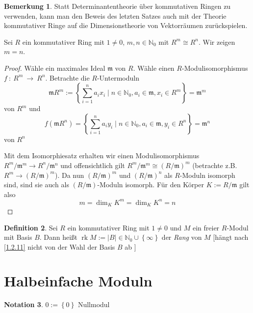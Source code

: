 \documentclass[
twoside=semi,
fontsize=12,
DIV=12, 
cleardoublepage=current,
leqno,
headings=optiontoheadandtoc, 
toc=idx
]{scrbook}
\newcommand{\N}{\mathbb{N}}
\newcommand{\set}[1]{\left\{ #1 \right\}}
\DeclareMathOperator{\rk}{rk}
\theoremstyle{definition}
\newtheorem{definition}{Definition}[section]
\newtheorem{bemerkung}[definition]{Bemerkung}
\newtheorem{notation}[definition]{Notation}
\begin{document}
	\begin{bemerkung}\label{1.2.12}\hfill\newline
		Statt Determinantentheorie \"uber kommutativen Ringen zu verwenden, kann man den Beweis des letzten Satzes auch mit der Theorie kommutativer Ringe auf die Dimensionstheorie von Vektorr\"aumen zur\"uckspielen. 
		
		\noindent Sei $R$ ein kommutativer Ring mit $1 \neq 0$, $m, n\in \N_0$ mit $R^m \cong R^n$. Wir zeigen $m = n$.
		
		\begin{proof}
			W\"ahle ein maximales Ideal $\mathfrak{m}$ von $R$. W\"ahle einen $R$-Modulisomorphismus $f~:~R^m~\to~R^n$. Betrachte die $R$-Untermoduln
			\[\mathfrak{m}R^m := \set{\sum_{i=1}^n a_ix_i \mid n \in \N_0, a_i \in \mathfrak{m}, x_i \in R^m} = \mathfrak{m}^m\]
			von $R^m$ und 
			\[f(\mathfrak{m}R^n) = \set{\sum_{i=1}^n a_iy_i \mid n \in \N_0, a_i \in \mathfrak{m}, y_i \in R^n} = \mathfrak{m}^n\]
			von $R^n$
			
			\noindent Mit dem Isomorphiesatz erhalten wir einen Modulisomorphismus $R^m/\mathfrak{m}^m \to R^n/\mathfrak{m}^n$ und offensichtlich gilt $R^m/\mathfrak{m}^m  \cong (R/\mathfrak{m})^m$ (betrachte z.B. $R^m \to (R/\mathfrak{m})^m$).\newline
			Da nun $(R/\mathfrak{m})^m$ und $(R/\mathfrak{m})^n$ als $R$-Moduln isomorph sind, sind sie auch als $(R/\mathfrak{m})$-Moduln isomorph. F\"ur den K\"orper $K:= R/\mathfrak{m}$ gilt also 
			\[m = \dim_K K^m = \dim_K K^n = n\]
		\end{proof}
	\end{bemerkung}

	\begin{definition}\label{1.2.13}\hfill\newline
		Sei $R$ ein kommutativer Ring mit $1 \neq 0$ und $M$ ein freier $R$-Modul mit Basis $B$. Dann hei\ss t $\rk M := |B| \in \N_0 \cup \set{\infty}$ der \emph{Rang} von $M$ [h\"angt nach \ref{1.2.11} nicht von der Wahl der Basis $B$ ab ]
	\end{definition}
	
	
	\newpage
	
	\section{Halbeinfache Moduln}
	\begin{notation}\label{1.3.1}\hfill\newline
		$0 := \set{0}$ Nullmodul
	\end{notation}
	
\end{document}
